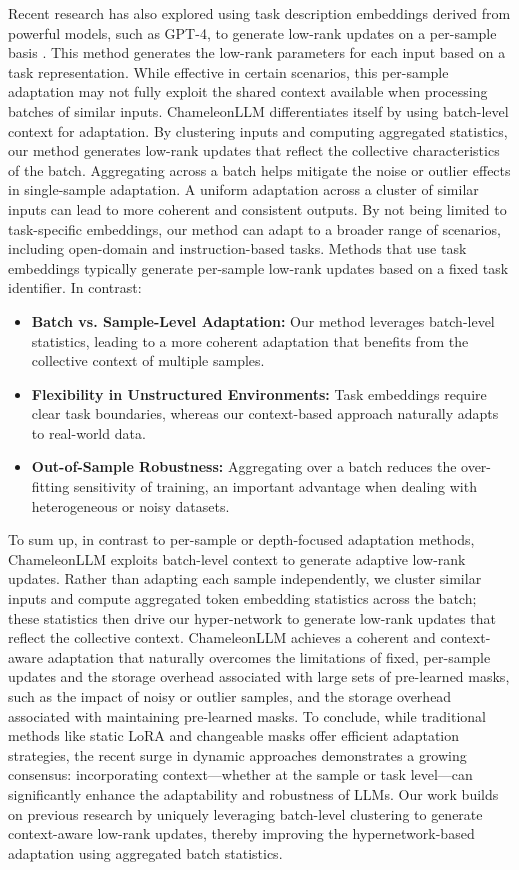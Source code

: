 Recent research has also explored using task description embeddings derived from powerful models, such as GPT-4, to generate low-rank updates on a per-sample basis \citep{charakorn2024instant}. This method generates the low-rank parameters for each input based on a task representation. While effective in certain scenarios, this per-sample adaptation may not fully exploit the shared context available when processing batches of similar inputs. ChameleonLLM differentiates itself by using batch-level context for adaptation. By clustering inputs and computing aggregated statistics, our method generates low-rank updates that reflect the collective characteristics of the batch. Aggregating across a batch helps mitigate the noise or outlier effects in single-sample adaptation. A uniform adaptation across a cluster of similar inputs can lead to more coherent and consistent outputs. By not being limited to task-specific embeddings, our method can adapt to a broader range of scenarios, including open-domain and instruction-based tasks. Methods that use task embeddings typically generate per-sample low-rank updates based on a fixed task identifier. In contrast:
\begin{itemize}
    \item \textbf{Batch vs. Sample-Level Adaptation:} Our method leverages batch-level statistics, leading to a more coherent adaptation that benefits from the collective context of multiple samples.
    \item \textbf{Flexibility in Unstructured Environments:} Task embeddings require clear task boundaries, whereas our context-based approach naturally adapts to real-world data.
    \item \textbf{Out-of-Sample Robustness:} Aggregating over a batch reduces the over-fitting sensitivity of training, an important advantage when dealing with heterogeneous or noisy datasets.
\end{itemize}

To sum up, in contrast to per-sample or depth-focused adaptation methods, ChameleonLLM exploits batch-level context to generate adaptive low-rank updates. Rather than adapting each sample independently, we cluster similar inputs and compute aggregated token embedding statistics across the batch; these statistics then drive our hyper-network to generate low-rank updates that reflect the collective context. ChameleonLLM achieves a coherent and context-aware adaptation that naturally overcomes the limitations of fixed, per-sample updates and the storage overhead associated with large sets of pre-learned masks, such as the impact of noisy or outlier samples, and the storage overhead associated with maintaining pre-learned masks. To conclude, while traditional methods like static LoRA and changeable masks offer efficient adaptation strategies, the recent surge in dynamic approaches demonstrates a growing consensus: incorporating context—whether at the sample or task level—can significantly enhance the adaptability and robustness of LLMs. Our work builds on previous research by uniquely leveraging batch-level clustering to generate context-aware low-rank updates, thereby improving the hypernetwork-based adaptation using aggregated batch statistics.